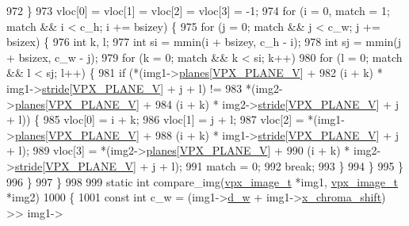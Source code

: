 \begin{DoxyCodeInclude}
{{{{{{{{{{{{{{{{{{{{{{{{{{{972   \}
973   vloc[0] = vloc[1] = vloc[2] = vloc[3] = -1;
974   \textcolor{keywordflow}{for} (i = 0, match = 1; match && i < c\_h; i += bsizey) \{
975     \textcolor{keywordflow}{for} (j = 0; match && j < c\_w; j += bsizex) \{
976       \textcolor{keywordtype}{int} k, l;
977       \textcolor{keywordtype}{int} si = mmin(i + bsizey, c\_h - i);
978       \textcolor{keywordtype}{int} sj = mmin(j + bsizex, c\_w - j);
979       \textcolor{keywordflow}{for} (k = 0; match && k < si; k++)
980         \textcolor{keywordflow}{for} (l = 0; match && l < sj; l++) \{
981           \textcolor{keywordflow}{if} (*(img1->\hyperlink{structvpx__image_ab6258308ba7a5f4a113348120e20e2ce}{planes}[\hyperlink{vpx__image_8h_aca9436ec761457cc6d2e356e0ac2fd23}{VPX\_PLANE\_V}] +
982                 (i + k) * img1->\hyperlink{structvpx__image_ac9c7b83e3eea44cb680956f90dc789cf}{stride}[\hyperlink{vpx__image_8h_aca9436ec761457cc6d2e356e0ac2fd23}{VPX\_PLANE\_V}] + j + l) !=
983               *(img2->\hyperlink{structvpx__image_ab6258308ba7a5f4a113348120e20e2ce}{planes}[\hyperlink{vpx__image_8h_aca9436ec761457cc6d2e356e0ac2fd23}{VPX\_PLANE\_V}] +
984                 (i + k) * img2->\hyperlink{structvpx__image_ac9c7b83e3eea44cb680956f90dc789cf}{stride}[\hyperlink{vpx__image_8h_aca9436ec761457cc6d2e356e0ac2fd23}{VPX\_PLANE\_V}] + j + l)) \{
985             vloc[0] = i + k;
986             vloc[1] = j + l;
987             vloc[2] = *(img1->\hyperlink{structvpx__image_ab6258308ba7a5f4a113348120e20e2ce}{planes}[\hyperlink{vpx__image_8h_aca9436ec761457cc6d2e356e0ac2fd23}{VPX\_PLANE\_V}] +
988                         (i + k) * img1->\hyperlink{structvpx__image_ac9c7b83e3eea44cb680956f90dc789cf}{stride}[\hyperlink{vpx__image_8h_aca9436ec761457cc6d2e356e0ac2fd23}{VPX\_PLANE\_V}] + j + l);
989             vloc[3] = *(img2->\hyperlink{structvpx__image_ab6258308ba7a5f4a113348120e20e2ce}{planes}[\hyperlink{vpx__image_8h_aca9436ec761457cc6d2e356e0ac2fd23}{VPX\_PLANE\_V}] +
990                         (i + k) * img2->\hyperlink{structvpx__image_ac9c7b83e3eea44cb680956f90dc789cf}{stride}[\hyperlink{vpx__image_8h_aca9436ec761457cc6d2e356e0ac2fd23}{VPX\_PLANE\_V}] + j + l);
991             match = 0;
992             \textcolor{keywordflow}{break};
993           \}
994         \}
995     \}
996   \}
997 \}
998 
999 \textcolor{keyword}{static} \textcolor{keywordtype}{int} compare\_img(\hyperlink{structvpx__image}{vpx\_image\_t} *img1, \hyperlink{structvpx__image}{vpx\_image\_t} *img2)
1000 \{
1001   \textcolor{keyword}{const} \textcolor{keywordtype}{int} c\_w = (img1->\hyperlink{structvpx__image_a806bf23143bf00a0b3fdbd6ba030c483}{d\_w} + img1->\hyperlink{structvpx__image_affaf210489dcefebd90b87fd5f12dc0b}{x\_chroma\_shift}) >> img1->
}}}}}}}}}}}}}}}}}}}}}}}}}}}
\end{DoxyCodeInclude}
